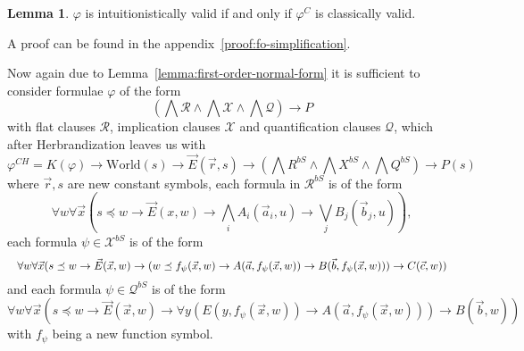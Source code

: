 \documentclass{easychair}
\theoremstyle{definition}
\theoremstyle{definition}
\theoremstyle{definition}
\newtheorem{lemma}[theorem]{Lemma}
\theoremstyle{definition}
\theoremstyle{definition}
\theoremstyle{definition}
\theoremstyle{definition}
\begin{document}
\begin{lemma}\label{lemma:fo-simplification}
	$\varphi$ is intuitionistically valid if and only if $\varphi^C$ is classically valid.
\end{lemma}

A proof can be found in the appendix~\ref*{proof:fo-simplification}.

Now again due to Lemma~\ref{lemma:first-order-normal-form} it is sufficient to consider formulae $\varphi$ of the form $$\left(\bigwedge\mathcal R\wedge\bigwedge\mathcal X\wedge\bigwedge\mathcal Q\right)\to P$$ with flat clauses $\mathcal R$, implication clauses $\mathcal X$ and quantification clauses $\mathcal Q$, which after Herbrandization leaves us with $$\varphi^{CH} = K(\varphi)\to\text{World}(s)\to\vec E(\vec r, s) \to \left(\bigwedge R^{bS}\wedge \bigwedge X^{bS}\wedge\bigwedge Q^{bS}\right)\to P(s)$$
where $\vec r, s$ are new constant symbols, each formula in $\mathcal R^{bS}$ is of the form
$$\forall w \forall \vec x(s\preceq w\to\vec E(x, w)\to\bigwedge_i A_i(\vec a_i, u)\to\bigvee_j B_j(\vec b_j, u)),$$
each formula $\psi\in\mathcal X^{bS}$ is of the form
$$
	\resizebox{\hsize}{!}{$\forall w\forall\vec x(s\preceq w\to\vec E(\vec x, w)\to (w\preceq f_\psi(\vec x, w)\to A(\vec a, f_\psi(\vec x, w))\to B(\vec b, f_\psi(\vec x, w)))\to C(\vec c, w))$}
$$
and each formula $\psi\in\mathcal Q^{bS}$ is of the form
$$\forall w\forall\vec x(s\preceq w\to\vec E(\vec x, w)\to \forall y(E(y, f_\psi(\vec x, w))\to A(\vec a, f_\psi(\vec x, w)))\to B(\vec{b}, w))$$
with $f_\psi$ being a new function symbol.
\end{document}
